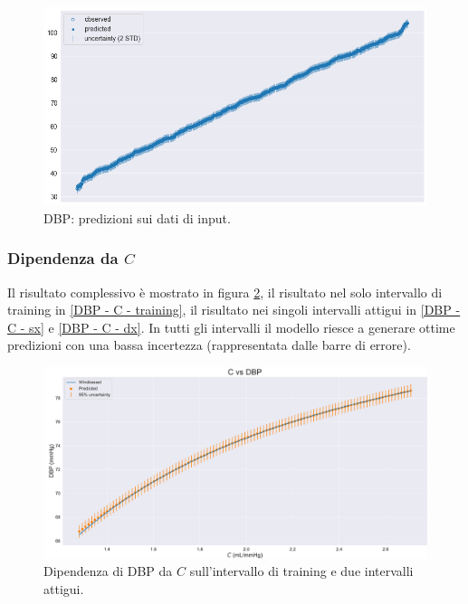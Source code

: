 \begin{figure}[h]
    \centering
    \includegraphics[width=1\textwidth]{images/Training (risultati)/DBP/DBP - inference.png}
    \caption{DBP: predizioni sui dati di input.}
    \label{DBP - inference}
\end{figure}



\subsubsection{Dipendenza da $C$}
Il risultato complessivo è mostrato in figura \ref{DBP - C - full}, il risultato nel solo intervallo di training in \ref{DBP - C - training}, il risultato nei singoli intervalli attigui in \ref{DBP - C - sx} e \ref{DBP - C - dx}. In tutti gli intervalli il modello riesce a generare ottime predizioni con una bassa incertezza (rappresentata dalle barre di errore).

\vspace{1cm}

\begin{figure}[!htb]
    \centering
    \includegraphics[width=1\textwidth]{images/Training (risultati)/DBP/DBP - C - full.pdf}
    \caption{Dipendenza di DBP da $C$ sull'intervallo di training e due intervalli attigui.}
    \label{DBP - C - full}
\end{figure}

